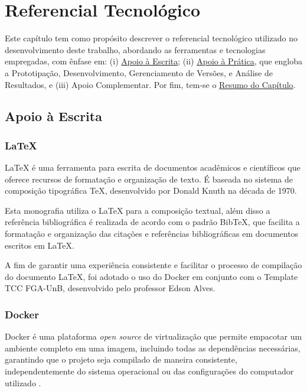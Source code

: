 \chapter[Referencial Tecnológico]{Referencial Tecnológico}
Este capítulo tem como propósito descrever o referencial tecnológico utilizado no desenvolvimento
deste trabalho, abordando as ferramentas e tecnologias empregadas, com ênfase em: (i) \hyperref[sec:Apoio à Escrita]{Apoio à Escrita}; 
(ii) \hyperref[sec:Apoio à Prática]{Apoio à Prática}, que engloba a Prototipação, Desenvolvimento, Gerenciamento de Versões, e Análise 
de Resultados, e (iii) Apoio Complementar. Por fim, tem-se o \hyperref[sec:Resumo do Capítulo]{Resumo do Capítulo}.

\section{Apoio à Escrita}
\label{sec:Apoio à Escrita}

\subsection{LaTeX}
\label{sec:Latex}
LaTeX \cite{latex} é uma ferramenta para escrita de documentos acadêmicos e científicos que oferece 
recursos de formatação e organização de texto. É baseada no sistema de composição tipográfica 
TeX, desenvolvido por Donald Knuth na década de 1970.

Esta monografia utiliza o LaTeX para a composição textual, além disso a referência bibliográfica 
é realizada de acordo com o padrão BibTeX, que facilita a formatação e organização das citações e 
referências bibliográficas em documentos escritos em LaTeX.

A fim de garantir uma experiência consistente e facilitar o processo de compilação do documento LaTeX, foi 
adotado o uso do Docker em conjunto com o Template TCC FGA-UnB, desenvolvido pelo professor 
Edson Alves. 

\subsection{Docker}
\label{sec:Docker}
Docker é uma plataforma \textit{open source} de virtualização que permite empacotar um ambiente completo em 
uma imagem, incluindo todas as dependências necessárias, garantindo que o projeto seja 
compilado de maneira consistente, independentemente do sistema operacional ou das configurações do computador 
utilizado \cite{docker}.

